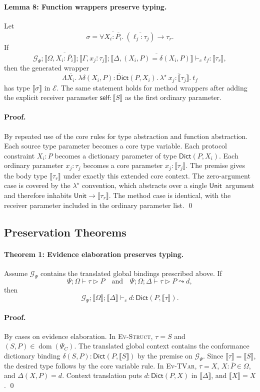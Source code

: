 \documentclass[manuscript,nonacm]{acmart}
\newcommand{\kw}[1]{\ensuremath{\mathsf{#1}}}
\newcommand{\Unit}{\kw{Unit}}
\newcommand{\dom}{\operatorname{dom}}
\newcommand{\ftype}[3]{\forall #1.\ (#2) \to #3}
\newcommand{\has}{\vdash}
\newcommand{\modelsP}{\mathrel{\triangleright}}
\newcommand{\elab}{\leadsto}
\newcommand{\trans}[1]{\llbracket #1 \rrbracket}
\newcommand{\lambdastar}{\lambda^{\star}}
\newcommand{\Dict}{\mathsf{Dict}}
\begin{document}
\paragraph{Lemma 8: Function wrappers preserve typing.}
Let
\[
  \sigma=
  \ftype{\overline{X_i:\overline{P_i}}}
         {\overline{\ell_j:\tau_j}}
         {\tau_r}.
\]
If
\[
  \mathcal{G}_\Psi;
  \trans{\Omega,\overline{X_i:\overline{P_i}}};
  \trans{\Gamma,\overline{x_j:\tau_j}};
  \trans{\Delta,\overline{(X_i,P)=\delta(X_i,P)}}
  \has_c t_f:\trans{\tau_r},
\]
then the generated wrapper
\[
  \Lambda \overline{X_i}.\
  \lambda \overline{\delta(X_i,P):\Dict(P,X_i)}.\
  \lambdastar\ \overline{x_j:\trans{\tau_j}}.\ t_f
\]
has type $\trans{\sigma}$ in $\mathcal{E}$.
The same statement holds for method wrappers after adding the explicit receiver parameter $\kw{self}:\trans{S}$ as the first ordinary parameter.

\paragraph{Proof.}
By repeated use of the core rules for type abstraction and function abstraction.
Each source type parameter becomes a core type variable.
Each protocol constraint $X_i:P$ becomes a dictionary parameter of type $\Dict(P,X_i)$.
Each ordinary parameter $x_j:\tau_j$ becomes a core parameter $x_j:\trans{\tau_j}$.
The premise gives the body type $\trans{\tau_r}$ under exactly this extended core context.
The zero-argument case is covered by the $\lambdastar$ convention, which abstracts over a single \Unit\ argument and therefore inhabits $\Unit\to\trans{\tau_r}$.
The method case is identical, with the receiver parameter included in the ordinary parameter list.
\qed

\subsection{Preservation Theorems}

\paragraph{Theorem 1: Evidence elaboration preserves typing.}
Assume $\mathcal{G}_\Psi$ contains the translated global bindings prescribed above.
If
\[
  \Psi;\Omega\has\tau\modelsP P
  \quad\text{and}\quad
  \Psi;\Omega;\Delta\has\tau\modelsP P\elab d,
\]
then
\[
  \mathcal{G}_\Psi;\trans{\Omega};\trans{\Delta}
  \has_c d:\Dict(P,\trans{\tau}).
\]

\paragraph{Proof.}
By cases on evidence elaboration.
In \textsc{Ev-Struct}, $\tau=S$ and $(S,P)\in\dom(\Psi_C)$.
The translated global context contains the conformance dictionary binding
$\delta(S,P):\Dict(P,\trans{S})$ by the premise on $\mathcal{G}_\Psi$.
Since $\trans{\tau}=\trans{S}$, the desired type follows by the core variable rule.
In \textsc{Ev-TVar}, $\tau=X$, $X:\overline{P}\in\Omega$, and $\Delta(X,P)=d$.
Context translation puts $d:\Dict(P,X)$ in $\trans{\Delta}$, and $\trans{X}=X$.
\qed
\end{document}
